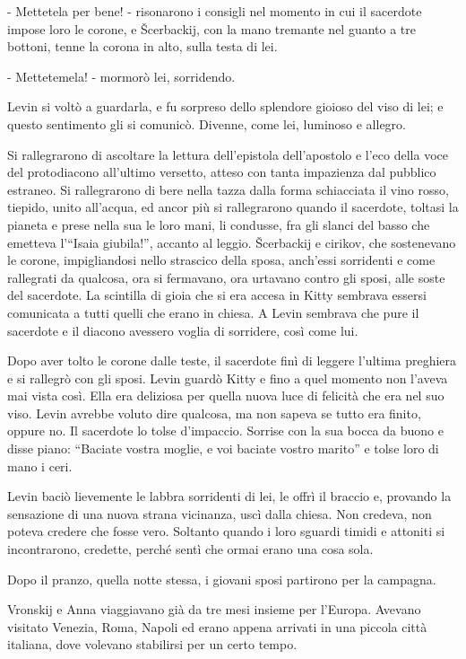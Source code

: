 - Mettetela per bene! - risonarono i consigli nel momento in cui il sacerdote impose loro le corone, e Šcerbackij, con la mano tremante nel guanto a tre bottoni, tenne la corona in alto, sulla testa di lei. 

- Mettetemela! - mormorò lei, sorridendo. 

Levin si voltò a guardarla, e fu sorpreso dello splendore gioioso del viso di lei; e questo sentimento gli si comunicò. Divenne, come lei, luminoso e allegro. 

Si rallegrarono di ascoltare la lettura dell'epistola dell'apostolo e l'eco della voce del protodiacono all'ultimo versetto, atteso con tanta impazienza dal pubblico estraneo. Si rallegrarono di bere nella tazza dalla forma schiacciata il vino rosso, tiepido, unito all'acqua, ed ancor più si rallegrarono quando il sacerdote, toltasi la pianeta e prese nella sua le loro mani, li condusse, fra gli slanci del basso che emetteva l'``Isaia giubila!'', accanto al leggio. Šcerbackij e cirikov, che sostenevano le corone, impigliandosi nello strascico della sposa, anch'essi sorridenti e come rallegrati da qualcosa, ora si fermavano, ora urtavano contro gli sposi, alle soste del sacerdote. La scintilla di gioia che si era accesa in Kitty sembrava essersi comunicata a tutti quelli che erano in chiesa. A Levin sembrava che pure il sacerdote e il diacono avessero voglia di sorridere, così come lui. 

Dopo aver tolto le corone dalle teste, il sacerdote finì di leggere l'ultima preghiera e si rallegrò con gli sposi. Levin guardò Kitty e fino a quel momento non l'aveva mai vista così. Ella era deliziosa per quella nuova luce di felicità che era nel suo viso. Levin avrebbe voluto dire qualcosa, ma non sapeva se tutto era finito, oppure no. Il sacerdote lo tolse d'impaccio. Sorrise con la sua bocca da buono e disse piano: ``Baciate vostra moglie, e voi baciate vostro marito'' e tolse loro di mano i ceri. 

Levin baciò lievemente le labbra sorridenti di lei, le offrì il braccio e, provando la sensazione di una nuova strana vicinanza, uscì dalla chiesa. Non credeva, non poteva credere che fosse vero. Soltanto quando i loro sguardi timidi e attoniti si incontrarono, credette, perché sentì che ormai erano una cosa sola. 

Dopo il pranzo, quella notte stessa, i giovani sposi partirono per la campagna. 

\label{vii-4} 

Vronskij e Anna viaggiavano già da tre mesi insieme per l'Europa. Avevano visitato Venezia, Roma, Napoli ed erano appena arrivati in una piccola città italiana, dove volevano stabilirsi per un certo tempo. 

